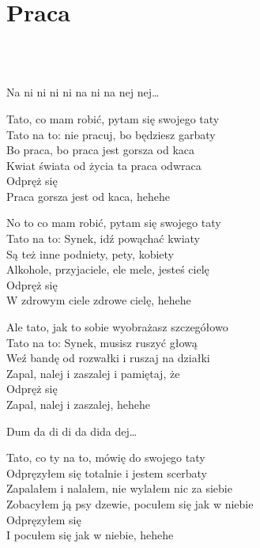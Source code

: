 \documentclass[a5paper, 10pt]{book}
\begin{document}
\section{Praca}\textcolor{lightgray}{\textit{}}\\~\\
\begin{minipage}[t]{0.8\textwidth}
Na ni ni ni ni na ni na nej nej…\vspace*{2mm}

Tato, co mam robić, pytam się swojego taty\\
Tato na to: nie pracuj, bo będziesz garbaty\\
Bo praca, bo praca jest gorsza od kaca\\
Kwiat świata od życia ta praca odwraca\\
\hspace*{5mm}Odpręż się\\
\hspace*{5mm}Praca gorsza jest od kaca, hehehe\vspace*{2mm}

No to co mam robić, pytam się swojego taty\\
Tato na to: Synek, idź powąchać kwiaty\\
Są też inne podniety, pety, kobiety\\
Alkohole, przyjaciele, ele mele, jesteś cielę\\
\hspace*{5mm}Odpręż się\\
\hspace*{5mm}W zdrowym ciele zdrowe cielę, hehehe\vspace*{2mm}

Ale tato, jak to sobie wyobrażasz szczegółowo\\
Tato na to: Synek, musisz ruszyć głową\\
Weź bandę od rozwałki i ruszaj na działki\\
Zapal, nalej i zaszalej i pamiętaj, że\\
\hspace*{5mm}Odpręż się\\
\hspace*{5mm}Zapal, nalej i zaszalej, hehehe\vspace*{2mm}

Dum da di di da dida dej…\vspace*{2mm}

Tato, co ty na to, mówię do swojego taty\\
Odpręzyłem się totalnie i jestem scerbaty\\
Zapalałem i nalałem, nie wylałem nic za siebie\\
Zobacyłem ją psy dzewie, pocułem się jak w niebie\\
\hspace*{5mm}Odpręzyłem się\\
\hspace*{5mm}I pocułem się jak w niebie, hehehe\vspace*{2mm}


\end{minipage}
\end{document}
